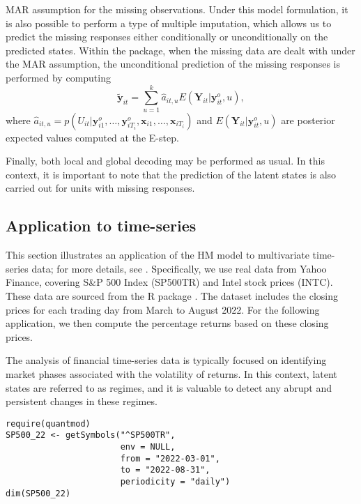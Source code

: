 MAR assumption for the missing observations. Under this model
formulation, it is also possible to perform a type of multiple
imputation, which allows us to predict the missing responses either
conditionally or unconditionally on the predicted states. Within the
 package, when the missing data are dealt with under the
MAR assumption, the unconditional prediction of the missing responses is
performed by computing
\[
\tilde{\boldsymbol{y}}_{it} = \sum_{u=1}^k \hat{a}_{it,u} E(\boldsymbol{Y}_{it}|\boldsymbol{y}_{it}^o, u),
\]
where
\(\hat{a}_{it,u} = p(U_{it}|\boldsymbol{y}_{i1}^o,\ldots,\boldsymbol{y}_{iT_i}^o, \boldsymbol{x}_{i1},\ldots,\boldsymbol{x}_{iT_i})\)
and \(E(\boldsymbol{Y}_{it}|\boldsymbol{y}_{it}^o, u)\) are posterior expected values
computed at the E-step.

Finally, both local and global decoding may be performed as usual. In
this context, it is important to note that the prediction of the latent
states is also carried out for units with missing responses.

\hypertarget{subsec:HMcontapp1}{%
\subsection{Application to time-series}\label{subsec:HMcontapp1}}

This section illustrates an application of the HM model to multivariate
time-series data; for more details, see \cite{penn:etal:22}.
Specifically, we use real data from Yahoo Finance, covering S\&P 500
Index (SP500TR) and Intel stock prices (INTC). These data are sourced
from the \textsf{R} package  \citep{quan:22}. The
dataset includes the closing prices for each trading day from March to
August 2022. For the following application, we then compute the
percentage returns based on these closing prices.

The analysis of financial time-series data is typically focused on
identifying market phases associated with the volatility of returns. In
this context, latent states are referred to as regimes, and it is
valuable to detect any abrupt and persistent changes in these regimes.

\begin{verbatim}
require(quantmod)
SP500_22 <- getSymbols("^SP500TR",
                       env = NULL,
                       from = "2022-03-01",
                       to = "2022-08-31",
                       periodicity = "daily")
dim(SP500_22)
\end{verbatim}

